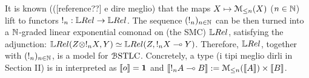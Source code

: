 \begin{remark}\label{rmk:ModelsOfBSTLC}
It is known {\color{red}(([reference??] e dire meglio)} that the maps $X\mapsto \mathcal{M}_{\leq n}(X)$ ($n\in\mathbb{N}$) lift to functors $!_n:\LREL\to\LREL$.
The sequence $(!_n)_{n\in\mathbb{N}}$ can be then turned into a $\mathbb{N}$-graded linear exponential comonad on (the SMC) $\LREL$, satisfying the adjunction:
$\LREL(Z\otimes !_{n}X,Y) \simeq \LREL(Z, !_{n}X\multimap Y)$.
Therefore, $\LREL$, together with $(!_n)_{n\in\mathbb{N}}$, is a model for $\mathcal{B}\mathrm{STLC}$. 
Concretely, a type %
{\color{red}(i tipi meglio dirli in Section II)} is in interpreted as $\llbracket o\rrbracket=\mathbf{1}$ and 
$\llbracket!_{n}A\multimap B\rrbracket:= \mathcal{M}_{\leq n}(\llbracket A\rrbracket) \times \llbracket B\rrbracket$.
\end{remark}



